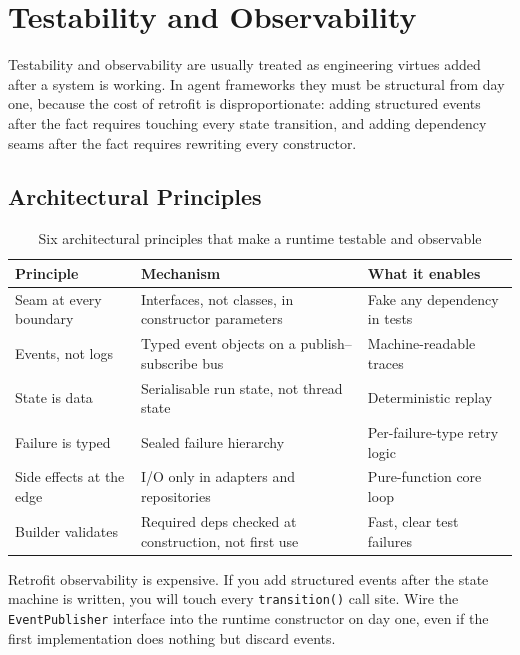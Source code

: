 \section{Testability and Observability}
\label{sec:testability-and-observability}

Testability and observability are usually treated as engineering virtues added after
a system is working.
In agent frameworks they must be structural from day one, because the cost of retrofit
is disproportionate: adding structured events after the fact requires touching every
state transition, and adding dependency seams after the fact requires rewriting every
constructor.

\subsection{Architectural Principles}
\label{subsec:architectural-principles}

\begin{table}[htbp]
\centering
\caption{Six architectural principles that make a runtime testable and observable}
\label{tab:arch-principles}
\begin{tabular}{lll}
\toprule
\textbf{Principle} & \textbf{Mechanism} & \textbf{What it enables} \\
\midrule
Seam at every boundary    & Interfaces, not classes, in constructor parameters & Fake any dependency in tests \\
Events, not logs          & Typed event objects on a publish–subscribe bus     & Machine-readable traces \\
State is data             & Serialisable run state, not thread state           & Deterministic replay \\
Failure is typed          & Sealed failure hierarchy                           & Per-failure-type retry logic \\
Side effects at the edge  & I/O only in adapters and repositories              & Pure-function core loop \\
Builder validates         & Required deps checked at construction, not first use & Fast, clear test failures \\
\bottomrule
\end{tabular}
\end{table}

\begin{warningbox}
  Retrofit observability is expensive.
  If you add structured events after the state machine is written, you will touch
  every \texttt{transition()} call site.
  Wire the \texttt{EventPublisher} interface into the runtime constructor on day one,
  even if the first implementation does nothing but discard events.
\end{warningbox}

